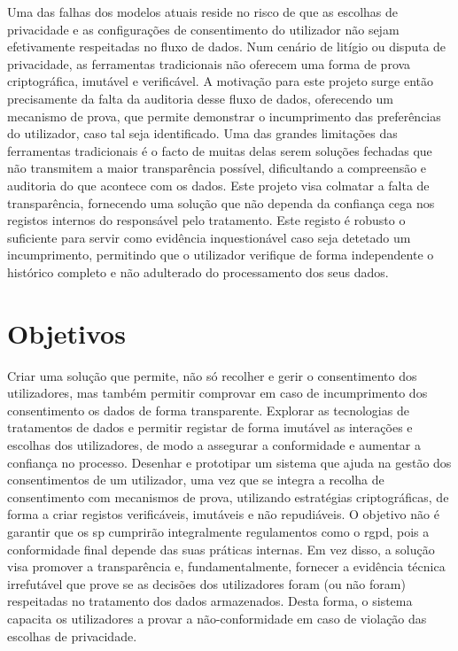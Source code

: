 Uma das falhas dos modelos atuais reside no risco de que as escolhas de privacidade e as configurações de consentimento do utilizador não sejam efetivamente respeitadas no fluxo de dados. Num cenário de litígio ou disputa de privacidade, as ferramentas tradicionais não oferecem uma forma de prova criptográfica, imutável e verificável.
A motivação para este projeto surge então precisamente da falta da auditoria desse fluxo de dados, oferecendo um mecanismo de prova, que permite demonstrar o incumprimento das preferências do utilizador, caso tal seja identificado.
Uma das grandes limitações das ferramentas tradicionais é o facto de muitas delas serem soluções fechadas que não transmitem a maior transparência possível, dificultando a compreensão e auditoria do que acontece com os dados.
Este projeto visa colmatar a falta de transparência, fornecendo uma solução que não dependa da confiança cega nos registos internos do responsável pelo tratamento. Este registo é robusto o suficiente para servir como evidência inquestionável caso seja detetado um incumprimento, permitindo que o utilizador verifique de forma independente o histórico completo e não adulterado do processamento dos seus dados.

\section{Objetivos}

Criar uma solução que permite, não só recolher e gerir o consentimento dos utilizadores, mas também permitir comprovar em caso de incumprimento dos consentimento os dados de forma transparente.
Explorar as tecnologias de tratamentos de dados e permitir registar de forma imutável as interações e escolhas dos utilizadores, de modo a assegurar a conformidade e aumentar a confiança no processo. 
Desenhar e prototipar um sistema que ajuda na gestão dos consentimentos de um utilizador, uma vez que se integra a recolha de consentimento com mecanismos de prova, utilizando estratégias criptográficas, de forma a criar registos verificáveis, imutáveis e não repudiáveis.
O objetivo não é garantir que os \acrfull{sp} cumprirão integralmente regulamentos como o \acrshort{rgpd}, pois a conformidade final depende das suas práticas internas. Em vez disso, a solução visa promover a transparência e, fundamentalmente, fornecer a evidência técnica irrefutável que prove se as decisões dos utilizadores foram (ou não foram) respeitadas no tratamento dos dados armazenados.
Desta forma, o sistema capacita os utilizadores a provar a não-conformidade em caso de violação das escolhas de privacidade.

